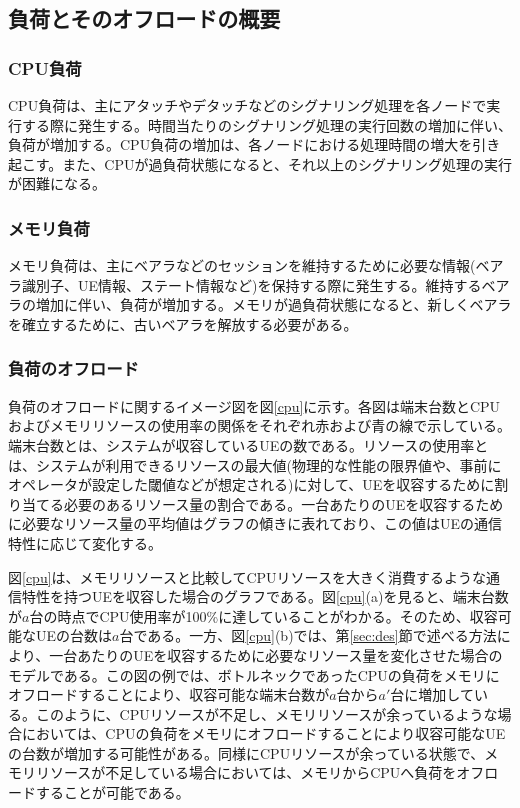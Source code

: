 \documentclass[a4j]{ujarticle}
\begin{document}
\subsection{負荷とそのオフロードの概要}
\subsubsection{CPU負荷}
CPU負荷は、主にアタッチやデタッチなどのシグナリング処理を各ノードで実行する際に発生する。時間当たりのシグナリング処理の実行回数の増加に伴い、負荷が増加する。CPU負荷の増加は、各ノードにおける処理時間の増大を引き起こす。また、CPUが過負荷状態になると、それ以上のシグナリング処理の実行が困難になる。
\subsubsection{メモリ負荷}
メモリ負荷は、主にベアラなどのセッションを維持するために必要な情報(ベアラ識別子、UE情報、ステート情報など)を保持する際に発生する。維持するベアラの増加に伴い、負荷が増加する。メモリが過負荷状態になると、新しくベアラを確立するために、古いベアラを解放する必要がある。
\subsubsection{負荷のオフロード}
負荷のオフロードに関するイメージ図を図\ref{cpu}に示す。各図は端末台数とCPUおよびメモリリソースの使用率の関係をそれぞれ赤および青の線で示している。端末台数とは、システムが収容しているUEの数である。リソースの使用率とは、システムが利用できるリソースの最大値(物理的な性能の限界値や、事前にオペレータが設定した閾値などが想定される)に対して、UEを収容するために割り当てる必要のあるリソース量の割合である。一台あたりのUEを収容するために必要なリソース量の平均値はグラフの傾きに表れており、この値はUEの通信特性に応じて変化する。

図\ref{cpu}は、メモリリソースと比較してCPUリソースを大きく消費するような通信特性を持つUEを収容した場合のグラフである。図\ref{cpu}(a)を見ると、端末台数が$a$台の時点でCPU使用率が100\%に達していることがわかる。そのため、収容可能なUEの台数は$a$台である。一方、図\ref{cpu}(b)では、第\ref{sec:des}節で述べる方法により、一台あたりのUEを収容するために必要なリソース量を変化させた場合のモデルである。この図の例では、ボトルネックであったCPUの負荷をメモリにオフロードすることにより、収容可能な端末台数が$a$台から$a'$台に増加している。このように、CPUリソースが不足し、メモリリソースが余っているような場合においては、CPUの負荷をメモリにオフロードすることにより収容可能なUEの台数が増加する可能性がある。同様にCPUリソースが余っている状態で、メモリリソースが不足している場合においては、メモリからCPUへ負荷をオフロードすることが可能である。
\end{document}
